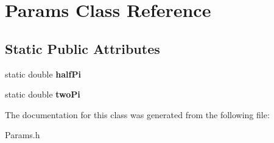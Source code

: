 \hypertarget{class_params}{}\section{Params Class Reference}
\label{class_params}
\subsection*{Static Public Attributes}
\begin{DoxyCompactItemize}
\item 
\hypertarget{class_params_ae258902d723f74b13db79033118f09d0}{}\label{class_params_ae258902d723f74b13db79033118f09d0} 
static double {\bfseries half\+Pi}
\item 
\hypertarget{class_params_a61ad40d9c752e33412fda7d0fca630cb}{}\label{class_params_a61ad40d9c752e33412fda7d0fca630cb} 
static double {\bfseries two\+Pi}
\end{DoxyCompactItemize}


The documentation for this class was generated from the following file\+:\begin{DoxyCompactItemize}
\item 
Params.\+h\end{DoxyCompactItemize}
